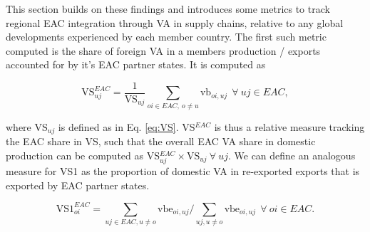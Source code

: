 \documentclass[a4paper]{article}
\begin{document}
This section builds on these findings and introduces some metrics to track regional EAC integration through VA in supply chains, relative to any global developments experienced by each member country. The first such metric computed is the share of foreign VA in a members production / exports accounted for by it's EAC partner states. It is computed as

\begin{equation} \label{eq:VS_EAC}
\text{VS}_{uj}^{EAC} = \frac{1}{\text{VS}_{uj}}  \sum_{oi \in EAC,\ o \neq  u} \text{vb}_{oi, uj}   \ \ \forall\ uj \in EAC,
\end{equation}

where VS$_{uj}$ is defined as in Eq. \ref{eq:VS}. VS$^{EAC}$ is thus a relative measure tracking the EAC share in VS, such that the overall EAC VA share in domestic production can be computed as VS$_{uj}^{EAC} \times \text{VS}_{uj} \ \forall\ uj$. We can define an analogous measure for VS1 as the proportion of domestic VA in re-exported exports that is exported by EAC partner states. 

\begin{equation} \label{eq:VS1_EAC}
\text{VS1}_{oi}^{EAC} =  \sum_{uj \in EAC, u \neq  o} \text{vbe}_{oi, uj} \bigg/ \sum_{uj, u \neq  o} \text{vbe}_{oi, uj}\ \ \forall\ oi \in EAC.
\end{equation}
\end{document}
